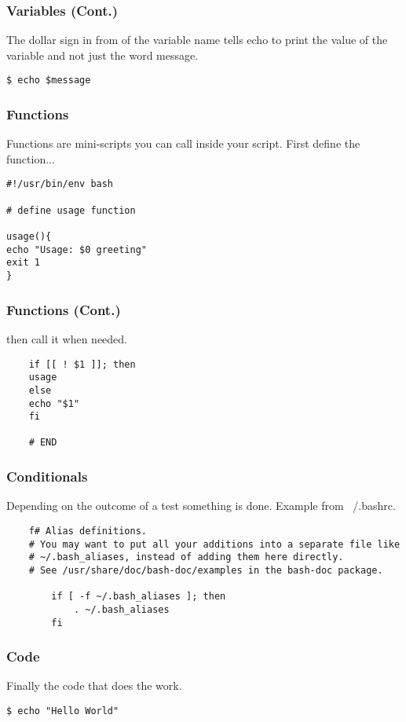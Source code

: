 \documentclass[12pt,handout,aspectratio=169]{beamer}
\begin{document}
\begin{frame}[fragile]
  \frametitle{Variables (Cont.)}
  The dollar sign in from of the variable name tells echo to print the value of the variable and not just the word message.
\begin{block}{}
\begin{verbatim}
$ echo $message
\end{verbatim}
\end{block}
\end{frame}
\begin{frame}[fragile]
  \frametitle{Functions}
  Functions are mini-scripts you can call inside your script. First define the function...
\begin{block}{}
\begin{verbatim}
#!/usr/bin/env bash

# define usage function

usage(){
echo "Usage: $0 greeting"
exit 1
}
\end{verbatim}
\end{block}
\end{frame}
\begin{frame}[fragile]
  \frametitle{Functions (Cont.)}
  then call it when needed.
\begin{block}{}
\begin{verbatim}
	if [[ ! $1 ]]; then
	usage
	else
	echo "$1"
	fi

	# END
\end{verbatim}
\end{block}
\end{frame}
\begin{frame}[fragile]
  \frametitle{Conditionals}
  Depending on the outcome of a test something is done. Example from ~/.bashrc.
\begin{block}{}
\begin{verbatim}
	f# Alias definitions.
	# You may want to put all your additions into a separate file like
	# ~/.bash_aliases, instead of adding them here directly.
	# See /usr/share/doc/bash-doc/examples in the bash-doc package.

		if [ -f ~/.bash_aliases ]; then
		    . ~/.bash_aliases
		fi
\end{verbatim}
\end{block}
\end{frame}
\begin{frame}[fragile]
  \frametitle{Code}
  Finally the code that does the work.
\begin{verbatim}
$ echo "Hello World"
\end{verbatim}

\end{frame}
\end{document}
